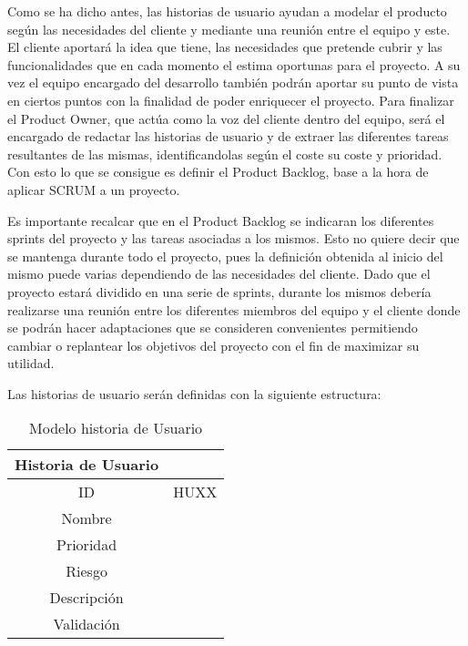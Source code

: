 Como se ha dicho antes, las historias de usuario ayudan a modelar el producto según las necesidades del cliente y mediante una reunión entre el equipo y este. El cliente aportará la idea que tiene, las necesidades que pretende cubrir y las funcionalidades que en cada momento el estima oportunas para el proyecto. A su vez el equipo encargado del desarrollo también podrán aportar su punto de vista en ciertos puntos con la finalidad de poder enriquecer el proyecto. Para finalizar el Product Owner, que actúa como la voz del cliente dentro del equipo, será el encargado de redactar las historias de usuario y de extraer las diferentes tareas resultantes de las mismas, identificandolas según el coste su coste y prioridad. Con esto lo que se consigue es definir el Product Backlog, base a la hora de aplicar SCRUM a un proyecto.

Es importante recalcar que en el Product Backlog se indicaran los diferentes sprints del proyecto y las tareas asociadas a los mismos. Esto no quiere decir que se mantenga durante todo el proyecto, pues la definición obtenida al inicio del mismo puede varias dependiendo de las necesidades del cliente. Dado que el proyecto estará dividido en una serie de sprints, durante los mismos debería realizarse una reunión entre los diferentes miembros del equipo y el cliente donde se podrán hacer adaptaciones que se consideren convenientes permitiendo cambiar o replantear los objetivos del proyecto con el fin de maximizar su utilidad.

Las historias de usuario serán definidas con la siguiente estructura:


\begin{table}[h]
	\begin{center}
		\begin{tabular}{| c | p{9cm} |}
			\hline
			
			Historia de Usuario &  \\ \hline
		 
		 
			ID & HUXX \\
			Nombre &  \\
			Prioridad &  \\
			Riesgo &  \\
			Descripción &  \\
			Validación &  \\ \hline
		\end{tabular}
		\caption{Modelo historia de Usuario}
		\label{tab:historia-usuario}
	\end{center}
\end{table}

